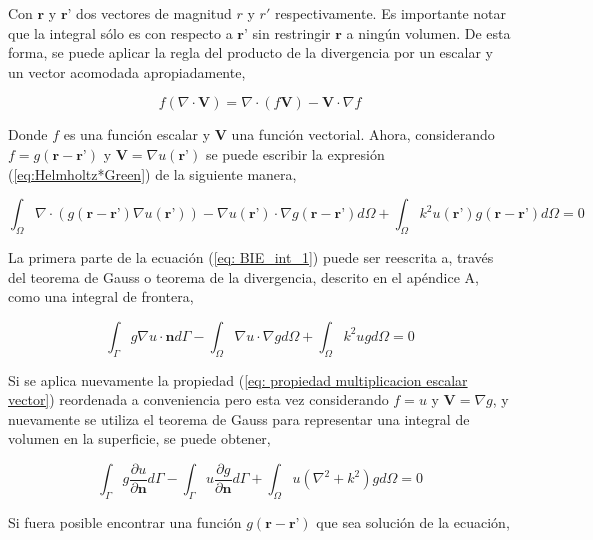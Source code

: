 \documentclass[12pt,letterpaper]{article}
\numberwithin{equation}{section}
\begin{document}
Con $\textbf{r}$ y $\textbf{r'}$ dos vectores de magnitud $r$ y $r'$ respectivamente. Es importante notar que la integral sólo es con respecto a $\textbf{r'}$ sin restringir $\textbf{r}$ a ningún volumen. De esta forma, se puede aplicar la regla del producto de la divergencia por un escalar y un vector acomodada apropiadamente,

\begin{equation}
	f(\nabla\cdot\textbf{V})=\nabla\cdot (f\textbf{V})-\textbf{V}\cdot\nabla f
\label{eq: propiedad multiplicacion escalar vector}
\end{equation}

Donde $f$ es una función escalar y $\textbf{V}$ una función vectorial. Ahora, considerando $f=g(\textbf{r}-\textbf{r'})$ y $\textbf{V}=\nabla u(\textbf{r'})$ se puede escribir la expresión (\ref{eq:Helmholtz*Green}) de la siguiente manera, 

\begin{equation}
\int_{\Omega}\nabla\cdot (g(\textbf{r}-\textbf{r'})\nabla u(\textbf{r'}))-\nabla u(\textbf{r'})\cdot\nabla g(\textbf{r}-\textbf{r'}) d\varOmega+\int_{\Omega}k^2u(\textbf{r'})g(\textbf{r}-\textbf{r'})d\varOmega=0
\label{eq: BIE_int_1}
\end{equation}

La primera parte de la ecuación (\ref{eq: BIE_int_1}) puede ser reescrita a, través del teorema de Gauss o teorema de la divergencia, descrito en el apéndice A, como una integral de frontera,

\begin{equation}
\int_{\Gamma}g\nabla u\cdot\textbf{n}d\varGamma-\int_{\Omega}\nabla u\cdot\nabla g d\varOmega+\int_{\Omega}k^2ugd\varOmega=0
\label{eq: BIE_int_2}
\end{equation}

Si se aplica nuevamente la propiedad (\ref{eq: propiedad multiplicacion escalar vector}) reordenada a conveniencia pero esta vez considerando $f=u$ y $\textbf{V}=\nabla g$, y nuevamente se utiliza el teorema de Gauss para representar una integral de volumen en la superficie, se puede obtener,

\begin{equation}
\int_{\Gamma}g\frac{\partial u}{\partial\textbf{n}}d\varGamma-\int_{\Gamma}u\frac{\partial g}{\partial\textbf{n}}d\varGamma+\int_{\Omega}u(\nabla^2+k^2)gd\varOmega=0
\label{eq: BIE_int_3}
\end{equation}

Si fuera posible encontrar una función $g(\textbf{r}-\textbf{r'})$ que sea solución de la ecuación,
\end{document}
